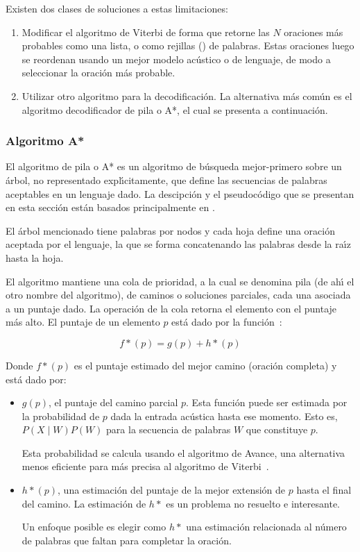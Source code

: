 Existen dos clases de soluciones a estas limitaciones:
\begin{enumerate}
	\item Modificar el algoritmo de Viterbi de forma que retorne las $N$ oraciones m\'as probables como una lista, o como 
	rejillas () de palabras. Estas oraciones luego se reordenan usando un mejor modelo ac\'ustico o de lenguaje,
	de modo a seleccionar la oraci\'on m\'as probable.
	\item Utilizar otro algoritmo para la decodificaci\'on. La alternativa m\'as com\'un es el algoritmo decodificador de pila o A*, el cual
	se presenta a continuaci\'on.
\end{enumerate}

\subsubsection{Algoritmo A*}
El algoritmo de pila o A* es un algoritmo de b\'usqueda mejor-primero sobre un \'arbol, no representado expl{\'\i}citamente, que define las
secuencias de palabras aceptables en un lenguaje dado. La descipci\'on y el pseudoc\'odigo que se presentan en esta secci\'on
est\'an basados principalmente en \cite{Jurafsky, PaulEfficient1992}.

El \'arbol mencionado tiene palabras por nodos y cada hoja define una oraci\'on aceptada por el lenguaje, la que se forma concatenando las 
palabras desde la ra{\'\i}z hasta la hoja.  

El algoritmo mantiene una cola de prioridad, a la cual se denomina pila (de ah{\'\i} el otro nombre del algoritmo), de caminos o soluciones 
parciales, cada una asociada a un puntaje dado. La operaci\'on  de la cola retorna el elemento con el puntaje m\'as alto. 
El puntaje de un elemento $p$ est\'a dado por la \mbox{funci\'on \cite{Jurafsky, Russell2003Solving}}:

\begin{equation*}
	f*(p) = g(p) + h*(p)
\end{equation*}

Donde $f*(p)$ es el puntaje estimado del mejor camino (oraci\'on completa) y est\'a dado por:

\begin{itemize}
 	\item $g(p)$, el puntaje del camino parcial $p$. Esta funci\'on puede ser estimada por la probabilidad de $p$ dada la entrada ac\'ustica
 	hasta ese momento. Esto es, $P(X \mid W)P(W)$ para la secuencia de palabras $W$ que constituye $p$. 

 	Esta probabilidad se calcula usando el algoritmo de Avance, una alternativa menos eficiente para m\'as precisa al algoritmo de \mbox{Viterbi \cite{Jurafsky}}.

 	\item $h*(p)$, una estimaci\'on del puntaje de la mejor extensi\'on de $p$ hasta el final del camino. La estimaci\'on de $h*$ es un problema
 	no resuelto e interesante. 

 	Un enfoque posible es elegir como $h*$ una estimaci\'on relacionada al n\'umero de palabras que faltan para
 	completar la oraci\'on.
 \end{itemize}

